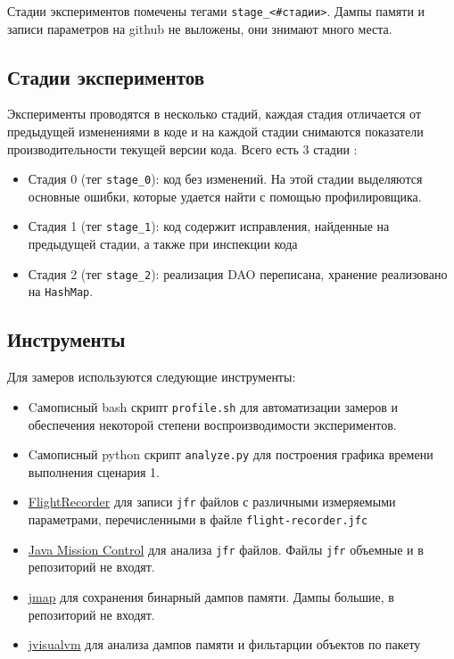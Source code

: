 \documentclass{article}
\begin{document}
		Стадии экспериментов помечены тегами \texttt{stage\_<\#стадии>}. Дампы памяти и записи параметров на github не выложены, они знимают много места.


	\subsection*{Стадии экспериментов}
		Эксперименты проводятся в несколько стадий, каждая стадия отличается от предыдущей изменениями в коде и на каждой стадии снимаются показатели производительности текущей версии кода. Всего есть 3 стадии :
		\begin{itemize}
			\item  Стадия 0 (тег \texttt{stage\_0}): код без изменений. На этой стадии выделяются основные ошибки, которые удается найти с помощью профилировщика.
			\item Стадия 1 (тег \texttt{stage\_1}): код содержит исправления, найденные на предыдущей стадии, а также при инспекции кода
			\item Стадия 2 (тег \texttt{stage\_2}): реализация DAO переписана, хранение реализовано на \texttt{HashMap}.
		\end{itemize}

	\subsection*{Инструменты}
		Для замеров используются следующие инструменты:
		\begin{itemize}
			\item Cамописный bash скрипт \texttt{profile.sh} для автоматизации замеров и обеспечения некоторой степени воспроизводимости экспериментов.
			\item Cамописный python скрипт \texttt{analyze.py} для построения графика времени выполнения сценария 1.
			\item \href{https://docs.oracle.com/javacomponents/jmc-5-5/jfr-runtime-guide/about.html}{FlightRecorder} для записи \texttt{jfr} файлов с различными измеряемыми параметрами, перечисленными в файле \texttt{flight-recorder.jfc}
			\item \href{https://www.oracle.com/technetwork/java/javaseproducts/mission-control/index.html}{Java Mission Control} для анализа \texttt{jfr} файлов. Файлы \texttt{jfr} объемные и в репозиторий не входят.
			\item \href{https://docs.oracle.com/javase/8/docs/technotes/tools/unix/jmap.html}{jmap} для сохранения бинарный дампов памяти. Дампы большие, в репозиторий не входят.
			\item \href{https://docs.oracle.com/javase/8/docs/technotes/guides/visualvm/index.html}{jvisualvm} для анализа дампов памяти и фильтарции объектов по пакету
		\end{itemize}
	
\end{document}
